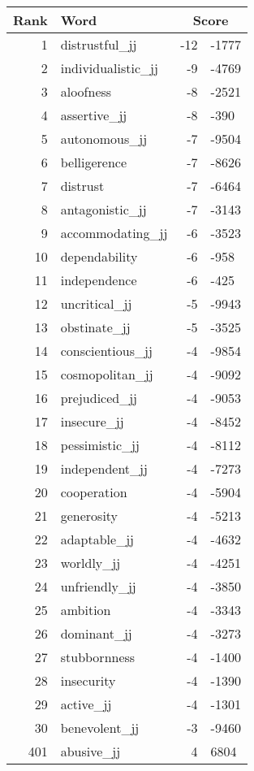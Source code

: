 \begin{longtable}[!htbp]{| rlr@{.}l |}
    \hline
    \textbf{Rank} & \textbf{Word} & \multicolumn{2}{c|}{\textbf{Score}} \\
    \hline
    \endhead
    1 & distrustful\_jj & -12 & -1777 \\
    2 & individualistic\_jj & -9 & -4769 \\
    3 & aloofness & -8 & -2521 \\
    4 & assertive\_jj & -8 & -390 \\
    5 & autonomous\_jj & -7 & -9504 \\
    6 & belligerence & -7 & -8626 \\
    7 & distrust & -7 & -6464 \\
    8 & antagonistic\_jj & -7 & -3143 \\
    9 & accommodating\_jj & -6 & -3523 \\
    10 & dependability & -6 & -958 \\
    11 & independence & -6 & -425 \\
    12 & uncritical\_jj & -5 & -9943 \\
    13 & obstinate\_jj & -5 & -3525 \\
    14 & conscientious\_jj & -4 & -9854 \\
    15 & cosmopolitan\_jj & -4 & -9092 \\
    16 & prejudiced\_jj & -4 & -9053 \\
    17 & insecure\_jj & -4 & -8452 \\
    18 & pessimistic\_jj & -4 & -8112 \\
    19 & independent\_jj & -4 & -7273 \\
    20 & cooperation & -4 & -5904 \\
    21 & generosity & -4 & -5213 \\
    22 & adaptable\_jj & -4 & -4632 \\
    23 & worldly\_jj & -4 & -4251 \\
    24 & unfriendly\_jj & -4 & -3850 \\
    25 & ambition & -4 & -3343 \\
    26 & dominant\_jj & -4 & -3273 \\
    27 & stubbornness & -4 & -1400 \\
    28 & insecurity & -4 & -1390 \\
    29 & active\_jj & -4 & -1301 \\
    30 & benevolent\_jj & -3 & -9460 \\
    401 & abusive\_jj & 4 & 6804 \\

\end{longtable}
